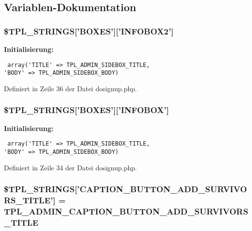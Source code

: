 \subsection{Variablen-Dokumentation}
\subsubsection{\setlength{\rightskip}{0pt plus 5cm}\$TPL\_\-STRINGS['BOXES']['INFOBOX2']}\label{dosignup_8php_ab431c722d5f87f8e9a1119ce1634d16}


\textbf{Initialisierung:}

\begin{Code}\begin{verbatim} array('TITLE' => TPL_ADMIN_SIDEBOX_TITLE,
'BODY' => TPL_ADMIN_SIDEBOX_BODY)
\end{verbatim}
\end{Code}


Definiert in Zeile 36 der Datei dosignup.php.
\subsubsection{\setlength{\rightskip}{0pt plus 5cm}\$TPL\_\-STRINGS['BOXES']['INFOBOX']}\label{dosignup_8php_47a202961f8da5800fabe9734b097d1e}


\textbf{Initialisierung:}

\begin{Code}\begin{verbatim} array('TITLE' => TPL_ADMIN_SIDEBOX_TITLE,
'BODY' => TPL_ADMIN_SIDEBOX_BODY)
\end{verbatim}
\end{Code}


Definiert in Zeile 34 der Datei dosignup.php.
\subsubsection{\setlength{\rightskip}{0pt plus 5cm}\$TPL\_\-STRINGS['CAPTION\_\-BUTTON\_\-ADD\_\-SURVIVORS\_\-TITLE'] = {\bf TPL\_\-ADMIN\_\-CAPTION\_\-BUTTON\_\-ADD\_\-SURVIVORS\_\-TITLE}}\label{dosignup_8php_665f7e1830592fd2a51af6f61d386db2}




